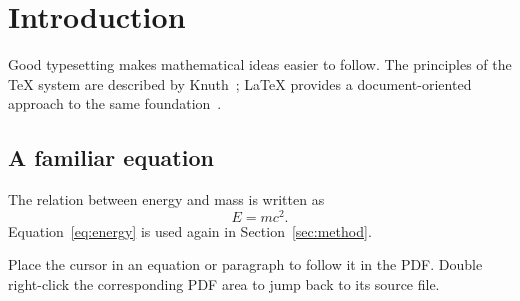 \section{Introduction}
\label{sec:introduction}

Good typesetting makes mathematical ideas easier to follow. The principles of
the TeX system are described by Knuth~\cite{knuth1984texbook}; LaTeX provides a
document-oriented approach to the same foundation~\cite{lamport1994latex}.

\subsection{A familiar equation}
The relation between energy and mass is written as
\begin{equation}
  E = mc^2.
  \label{eq:energy}
\end{equation}
Equation~\eqref{eq:energy} is used again in Section~\ref{sec:method}.


Place the cursor in an equation or paragraph to follow it in the PDF. Double
right-click the corresponding PDF area to jump back to its source file.
